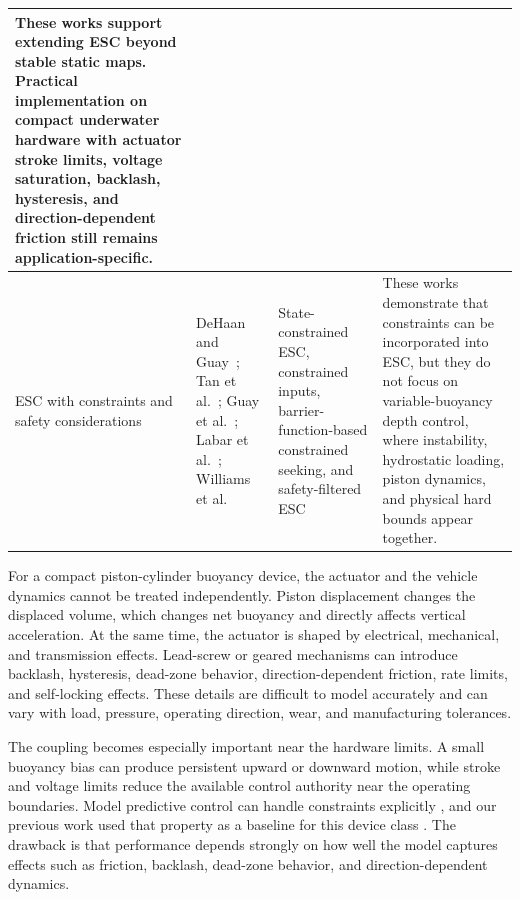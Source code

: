 ﻿\documentclass[subscriptcorrection,upint,varvw,barcolor=Goldenrod3,mathalfa=cal=euler,balance,hyphenate,french,pdf-a]{asmejour}
\begin{document}
\begin{table}[t]
\begin{tabular}{p{} p{} p{} p{}}
These works support extending ESC beyond stable static maps. Practical implementation on compact underwater hardware with actuator stroke limits, voltage saturation, backlash, hysteresis, and direction-dependent friction still remains application-specific. \\
\hline
ESC with constraints and safety considerations &
DeHaan and Guay~\cite{dehaan2005state}; Tan et al.~\cite{tan2013constrained}; Guay et al.~\cite{guay2015constrained}; Labar et al.~\cite{labar2019barrier}; Williams et al.~\cite{williams2024safe} &
State-constrained ESC, constrained inputs, barrier-function-based constrained seeking, and safety-filtered ESC &
These works demonstrate that constraints can be incorporated into ESC, but they do not focus on variable-buoyancy depth control, where instability, hydrostatic loading, piston dynamics, and physical hard bounds appear together. \\
\hline
\end{tabular}
\end{table}

For a compact piston-cylinder buoyancy device, the actuator and the vehicle dynamics cannot be treated independently. Piston displacement changes the displaced volume, which changes net buoyancy and directly affects vertical acceleration. At the same time, the actuator is shaped by electrical, mechanical, and transmission effects. Lead-screw or geared mechanisms can introduce backlash, hysteresis, dead-zone behavior, direction-dependent friction, rate limits, and self-locking effects. These details are difficult to model accurately and can vary with load, pressure, operating direction, wear, and manufacturing tolerances.

The coupling becomes especially important near the hardware limits. A small buoyancy bias can produce persistent upward or downward motion, while stroke and voltage limits reduce the available control authority near the operating boundaries. Model predictive control can handle constraints explicitly \cite{mayne2000constrained}, and our previous work used that property as a baseline for this device class \cite{masood2023constrained}. The drawback is that performance depends strongly on how well the model captures effects such as friction, backlash, dead-zone behavior, and direction-dependent dynamics.
\end{document}
